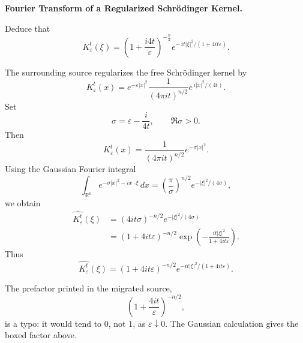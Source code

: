 \begin{problem}[CP-II-0419]
\label{prob:cp-ii-0419}
\textbf{Fourier Transform of a Regularized Schrödinger Kernel.}

\hspace*{1.5em}Deduce that
		\[
		\widehat{K_\varepsilon^t}(\xi)
		= \left(1+\frac{i4t}{\varepsilon}\right)^{-\tfrac{n}{2}}
		e^{-\, i t|\xi|^2/(1+4it\varepsilon)}.
		\]
\end{problem}

\begin{solution}
The surrounding source regularizes the free Schrödinger kernel by
\[
K_\varepsilon^t(x)
=
e^{-\varepsilon|x|^2}
\frac{1}{(4\pi it)^{n/2}}
e^{\,i|x|^2/(4t)}.
\]
Set
\[
\sigma
=
\varepsilon-\frac{i}{4t},
\qquad
\Re\sigma>0.
\]
Then
\[
K_\varepsilon^t(x)
=
\frac{1}{(4\pi it)^{n/2}}
e^{-\sigma|x|^2}.
\]
Using the Gaussian Fourier integral
\[
\int_{\mathbb R^n}
e^{-\sigma|x|^2-i x\cdot\xi}\,dx
=
\left(\frac{\pi}{\sigma}\right)^{n/2}
e^{-|\xi|^2/(4\sigma)},
\]
we obtain
\[
\begin{aligned}
\widehat{K_\varepsilon^t}(\xi)
&=
(4it\sigma)^{-n/2}
e^{-|\xi|^2/(4\sigma)}\\
&=
(1+4it\varepsilon)^{-n/2}
\exp\left(
-\frac{it|\xi|^2}{1+4it\varepsilon}
\right).
\end{aligned}
\]
Thus
\[
\boxed{
\widehat{K_\varepsilon^t}(\xi)
=
(1+4it\varepsilon)^{-n/2}
e^{-it|\xi|^2/(1+4it\varepsilon)}.
}
\]

The prefactor printed in the migrated source,
\[
\left(1+\frac{4it}{\varepsilon}\right)^{-n/2},
\]
is a typo: it would tend to \(0\), not \(1\), as \(\varepsilon\downarrow0\). The Gaussian
calculation gives the boxed factor above.
\end{solution}


